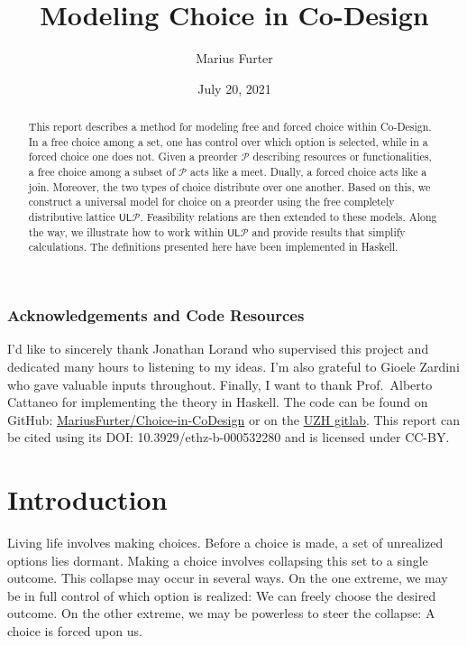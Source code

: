 \documentclass[12pt]{article}
\title{Modeling Choice in Co-Design}
\author{Marius Furter}
\date{July 20, 2021}
\theoremstyle{definition}
\theoremstyle{plain}
\theoremstyle{plain}
\theoremstyle{plain}
\theoremstyle{plain}
\theoremstyle{remark}
\theoremstyle{remark}
\newcommand{\mc}[1]{\mathcal{#1}}
\newcommand{\low}{\mathsf{L}}
\newcommand{\upper}{\mathsf{U}}
\begin{document}
\maketitle

\begin{abstract}
	This report describes a method for modeling free and forced choice within Co-Design. In a free choice among a set, one has control over which option is selected, while in a forced choice one does not. Given a preorder $\mc{P}$ describing resources or functionalities, a free choice among a subset of $\mc{P}$ acts like a meet. Dually, a forced choice acts like a join. Moreover, the two types of choice distribute over one another. Based on this, we construct a universal model for choice on a preorder using the free completely distributive lattice $\upper\low\mc{P}$. Feasibility relations are then extended to these models. Along the way, we illustrate how to work within $\upper\low\mc{P}$ and provide results that simplify calculations. The definitions presented here have been implemented in Haskell.
\end{abstract}

\vspace{3cm}
\subsubsection*{\centering Acknowledgements and Code Resources}
I'd like to sincerely thank Jonathan Lorand who supervised this project and dedicated many hours to listening to my ideas. I'm also grateful to Gioele Zardini who gave valuable inputs throughout. Finally, I want to thank Prof.~Alberto Cattaneo for implementing the theory in Haskell. The code can be found on GitHub: \href{https://github.com/MariusFurter/Choice-in-CoDesign}{MariusFurter/Choice-in-CoDesign} or on the \href{https://git.math.uzh.ch/asc/choice-in-codesign}{UZH gitlab}. This report can be cited using its DOI: 10.3929/ethz-b-000532280 and is licensed under CC-BY.
\newpage
\tableofcontents
\newpage

\section{Introduction}
Living life involves making choices. Before a choice is made, a set of unrealized options lies dormant. Making a choice involves collapsing this set to a single outcome. This collapse may occur in several ways. On the one extreme, we may be in full control of which option is realized: We can freely choose the desired outcome. On the other extreme, we may be powerless to steer the collapse: A choice is forced upon us.
\end{document}
